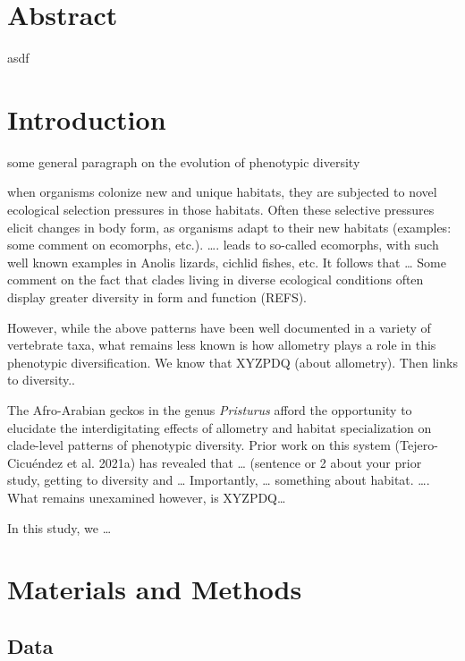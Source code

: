 \documentclass[
]{article}
\begin{document}
\newpage

\hypertarget{abstract}{%
\section{Abstract}\label{abstract}}

asdf

\newpage

\hypertarget{introduction}{%
\section{Introduction}\label{introduction}}

some general paragraph on the evolution of phenotypic diversity
\hfill\break

when organisms colonize new and unique habitats, they are subjected to
novel ecological selection pressures in those habitats. Often these
selective pressures elicit changes in body form, as organisms adapt to
their new habitats (examples: some comment on ecomorphs, etc.). \ldots.
leads to so-called ecomorphs, with such well known examples in Anolis
lizards, cichlid fishes, etc. It follows that \ldots{} Some comment on
the fact that clades living in diverse ecological conditions often
display greater diversity in form and function (REFS).

However, while the above patterns have been well documented in a variety
of vertebrate taxa, what remains less known is how allometry plays a
role in this phenotypic diversification. We know that XYZPDQ (about
allometry). Then links to diversity..

The Afro-Arabian geckos in the genus \emph{Pristurus} afford the
opportunity to elucidate the interdigitating effects of allometry and
habitat specialization on clade-level patterns of phenotypic diversity.
Prior work on this system (Tejero-Cicuéndez et al. 2021a) has revealed
that \ldots{} (sentence or 2 about your prior study, getting to
diversity and \ldots{} Importantly, \ldots{} something about habitat.
\ldots. What remains unexamined however, is XYZPDQ\ldots{}

In this study, we \ldots{}

\hypertarget{materials-and-methods}{%
\section{Materials and Methods}\label{materials-and-methods}}

\hypertarget{data}{%
\subsection{Data}\label{data}}
\end{document}
